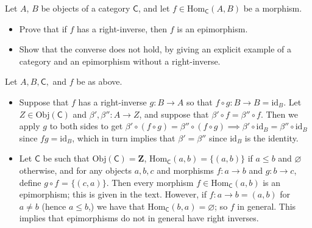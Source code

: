 \documentclass[12pt,letterpaper,boxed]{hmcpset}
\newcommand{\Obj}{\mathrm{Obj}}
\newcommand{\Hom}{\mathrm{Hom}}
\newcommand{\C}{\mathbb{C}}
\newcommand{\id}{\mathrm{id}}
\begin{document}
\begin{problem}[4.3]
	\def \C {\mathsf{C}}
	Let $A$, $B$ be objects of a category $\mathsf{C}$, and let $f \in \Hom_\mathsf{C}(A, B)$ be a
	morphism. 
	\begin{itemize}
		\item Prove that if $f$ has a right-inverse, then $f$ is an epimorphism.
		\item Show that the converse does not hold, by giving an explicit example of a
		category and an epimorphism without a right-inverse.
	\end{itemize}
\end{problem}
\begin{solution}
	\def \C {\mathsf{C}}
	
	Let $A,B,\mathsf{C},$ and $f$ be as above.
	\begin{itemize}
		\item Suppose that $f$ has a right-inverse $g:B\to A$ so that $f\circ g: B\to B
		= \id_B$. Let $Z\in\Obj(\mathsf{C})$ and $\beta',\beta'':A\to Z$, and suppose that
		$\beta'\circ f=\beta''\circ f$. Then we apply $g$ to both sides to get
		$\beta'\circ(f\circ g) = \beta''\circ(f\circ g) \implies \beta'\circ\id_B =
		\beta''\circ \id_B$ since $fg=\id_B$, which in turn implies that
		$\beta'=\beta''$ since $\id_B$ is the identity.
		
		\item Let $\mathsf{C}$ be such that $\Obj(\mathsf{C}) = \mathbf{Z}$, $\Hom_\mathsf{C}(a,b)=\{(a,b)\}$ if
		$a\leq b$ and $\varnothing$ otherwise, and for any objects $a,b,c$ and morphisms
		$f:a\to b$ and $g:b\to c$, define $g\circ f$ = $\{(c,a)\}$. Then every morphism
		$f\in\Hom_\mathsf{C}(a,b)$ is an epimorphism; this is given in the text. However, if
		$f:a\to b = (a,b)$ for $a\neq b$ (hence $a\leq b$,) we have that
		$\Hom_\mathsf{C}(b,a)=\varnothing$; so $f$ in general. This implies that epimorphisms do
		not in general have right inverses.
	\end{itemize}
\end{solution}
\end{document}
